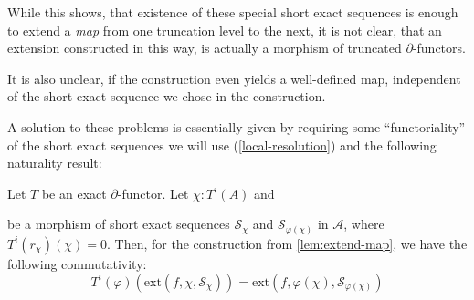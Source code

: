 While this shows, that existence of these special short exact sequences
is enough to extend a \emph{map} from one truncation level to the next,
it is not clear, that an extension constructed in this way,
is actually a morphism of truncated $\partial$-functors.

It is also unclear, if the construction even yields a well-defined map,
independent of the short exact sequence we chose in the construction.

A solution to these problems is essentially given by
requiring some ``functoriality'' of the short exact sequences we will use (\cref{local-resolution}) and
the following naturality result:

\begin{lemma}
  \label{lem:extension-welldefined}
  Let $T$ be an exact $\partial$-functor.
  Let $\chi:T^i(A)$ and
  \begin{center}
  \end{center}
  be a morphism of short exact sequences ${\mathcal S}_\chi$ and $\mathcal{S}_{\varphi(\chi)}$ in $\mathcal A$,
  where $T^i(r_\chi)(\chi)=0$.
  Then, for the construction from \cref{lem:extend-map}, we have the following commutativity:
  \[ T^i(\varphi)(\mathrm{ext}(f,\chi,{\mathcal S}_\chi)) = \mathrm{ext}(f,\varphi(\chi),\mathcal{S}_{\varphi(\chi)}) \]
\end{lemma}

